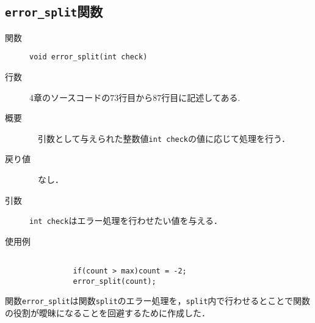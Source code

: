 \documentclass[a4j,11pt]{jarticle}
\begin{document}
\subsection{\texttt{error\_split}関数}
 \begin{description}
    \item[関数] \verb|void error_split(int check)|
    \item[行数]  4章のソースコードの73行目から87行目に記述してある.
    \item[概要]　引数として与えられた整数値\verb|int check|の値に応じて処理を行う．
    \item[戻り値]　なし．
    \item[引数]  \verb|int check|はエラー処理を行わせたい値を与える．
    \item[使用例]
      \begin{verbatim}

          if(count > max)count = -2;
          error_split(count);
      \end{verbatim}
\end{description}
関数\verb|error_split|は関数\verb|split|のエラー処理を，\verb|split|内で行わせるとことで関数の役割が曖昧になることを回避するために作成した．
\end{document}
